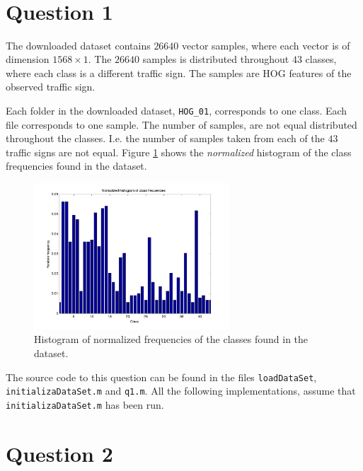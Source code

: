 \documentclass[10pt]{article}
\author{\authorName \\\texttt{\small{\authorEmail}}}
\title{\textsc{\titleName \\ \courseName}}
\begin{document}
\maketitle 


\section*{Question 1} %
\label{sec:question_1}

The downloaded dataset contains $26640$ vector samples, where each vector is of dimension $1568 \times 1$. The $26640$ samples is distributed throughout $43$ classes, where each class is a different traffic sign. The samples are HOG features of the observed traffic sign.

Each folder in the downloaded dataset, \texttt{HOG_01}, corresponds to one class. Each file corresponds to one sample. The number of samples, are not equal distributed throughout the classes. I.e. the number of samples taken from each of the $43$ traffic signs are not equal. Figure \ref{fig1} shows the \emph{normalized} histogram of the class frequencies found in the dataset.

\begin{figure}[ht]
\centering
\includegraphics[width=0.65\textwidth]{figures/q1.png}
\caption{Histogram of normalized frequencies of the classes found in the dataset.}
\label{fig1}
\end{figure}

The source code to this question can be found in the files \texttt{loadDataSet}, \texttt{initializaDataSet.m} and \texttt{q1.m}. All the following implementations, assume that \texttt{initializaDataSet.m} has been run.


\section*{Question 2} %
\label{sec:question_2}
\end{document}
